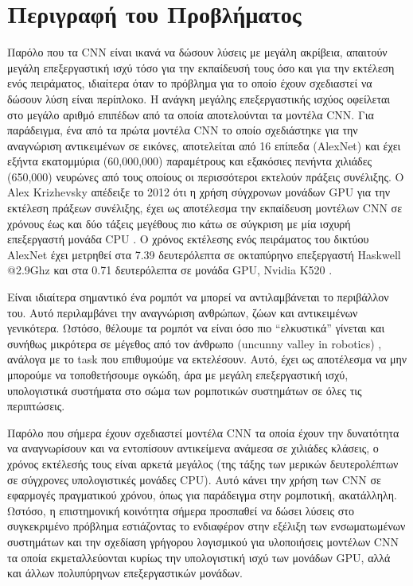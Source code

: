 \section{Περιγραφή του Προβλήματος}
\label{section:problem_description}

Παρόλο που τα CΝΝ είναι ικανά να δώσουν λύσεις με μεγάλη ακρίβεια, απαιτούν
μεγάλη επεξεργαστική ισχύ τόσο για την εκπαίδευσή τους όσο και για την
εκτέλεση ενός πειράματος, ιδιαίτερα όταν το πρόβλημα για το οποίο έχουν
σχεδιαστεί να δώσουν λύση είναι περίπλοκο.
Η ανάγκη μεγάλης επεξεργαστικής ισχύος οφείλεται στο μεγάλο αριθμό επιπέδων
από τα οποία αποτελούνται τα μοντέλα CNN.
Για παράδειγμα, ένα από τα πρώτα μοντέλα CNN το οποίο σχεδιάστηκε για την
αναγνώριση αντικειμένων σε εικόνες, αποτελείται από 16 επίπεδα (AlexNet)
και έχει εξήντα εκατομμύρια (60,000,000) παραμέτρους και
εξακόσιες πενήντα χιλιάδες (650,000) νευρώνες από τους οποίους οι περισσότεροι
εκτελούν πράξεις συνέλιξης. Ο Alex Krizhevsky απέδειξε το 2012 ότι η χρήση
σύγχρονων μονάδων GPU για την εκτέλεση πράξεων συνέλιξης, έχει ως αποτέλεσμα την
εκπαίδευση μοντέλων CNN σε χρόνους έως και δύο τάξεις μεγέθους πιο κάτω σε σύγκριση
με μία ισχυρή επεξεργαστή μονάδα CPU \cite{NIPS2012_4824}.
Ο χρόνος εκτέλεσης ενός πειράματος του δικτύου AlexNet
έχει μετρηθεί στα 7.39 δευτερόλεπτα σε οκταπύρηνο επεξεργαστή Haskwell @2.9Ghz
και στα 0.71 δευτερόλεπτα σε μονάδα GPU, Nvidia K520 \cite{abuzaidoptimizing}.

Είναι ιδιαίτερα σημαντικό ένα ρομπότ να μπορεί να αντιλαμβάνεται το περιβάλλον
του.
Αυτό περιλαμβάνει την αναγνώριση ανθρώπων, ζώων και αντικειμένων γενικότερα. Ωστόσο,
θέλουμε τα ρομπότ να είναι όσο πιο “ελκυστικά” γίνεται και συνήθως μικρότερα σε μέγεθος από τον άνθρωπο (uncunny valley in robotics) \cite{mori2012uncanny},
ανάλογα με το task που επιθυμούμε να εκτελέσουν.
Αυτό, έχει ως αποτέλεσμα να μην μπορούμε να τοποθετήσουμε ογκώδη, άρα με μεγάλη
επεξεργαστική ισχύ, υπολογιστικά συστήματα στο σώμα των ρομποτικών συστημάτων σε όλες
τις περιπτώσεις.

Παρόλο που σήμερα έχουν σχεδιαστεί μοντέλα CNN τα οποία έχουν την δυνατότητα να
αναγνωρίσουν και να εντοπίσουν αντικείμενα ανάμεσα σε χιλιάδες
κλάσεις, ο χρόνος εκτέλεσής τους
είναι αρκετά μεγάλος (της τάξης των μερικών δευτερολέπτων σε σύγχρονες υπολογιστικές μονάδες CPU).
Αυτό κάνει την χρήση των CNN σε εφαρμογές πραγματικού χρόνου, όπως για παράδειγμα
στην ρομποτική, ακατάλληλη.
Ωστόσο, η επιστημονική κοινότητα σήμερα προσπαθεί να δώσει λύσεις στο συγκεκριμένο
πρόβλημα εστιάζοντας το ενδιαφέρον στην εξέλιξη των ενσωματωμένων συστημάτων
και την σχεδίαση γρήγορου λογισμικού για υλοποιήσεις μοντέλων CNN τα οποία
εκμεταλλεύονται κυρίως την υπολογιστική ισχύ των μονάδων GPU, αλλά και άλλων
πολυπύρηνων επεξεργαστικών μονάδων.
